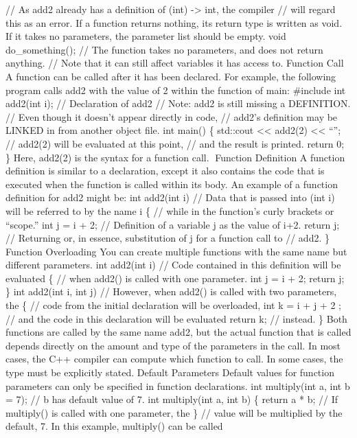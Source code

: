 {// As add2 already has a definition of (int) -\textgreater{} int, the
compiler // will regard this as an error. If a function returns nothing,
its return type is written as void. If it takes no parameters, the
parameter list should be empty. void do\_something(); // The function
takes no parameters, and does not return anything. // Note that it can
still affect variables it has access to. Function Call A function can be
called after it has been declared. For example, the following program
calls add2 with the value of 2 within the function of main: \#include
int add2(int i); // Declaration of add2 // Note: add2 is still missing a
DEFINITION. // Even though it doesn't appear directly in code, // add2's
definition may be LINKED in from another object file. int main() \{
std::cout \textless\textless{} add2(2) \textless\textless{} ``\n''; //
add2(2) will be evaluated at this point, // and the result is printed.
return 0;\\
\} Here, add2(2) is the syntax for a function call. Function Deﬁnition
A function deﬁnition} is similar to a declaration, except it also
contains the code that is executed when the function is called within
its body. An example of a function deﬁnition for add2 might be: int
add2(int i) // Data that is passed into (int i) will be referred to by
the name i \{ // while in the function's curly brackets or ``scope.''
int j = i + 2; // Definition of a variable j as the value of i+2. return
j; // Returning or, in essence, substitution of j for a function call to
// add2. \} Function Overloading You can create multiple functions with
the same name but diﬀerent parameters. int add2(int i) // Code contained
in this definition will be evaluated \{ // when add2() is called with
one parameter. int j = i + 2; return j; \} int add2(int i, int j) //
However, when add2() is called with two parameters, the \{ // code from
the initial declaration will be overloaded, int k = i + j + 2 ; // and
the code in this declaration will be evaluated return k; // instead. \}
Both functions are called by the same name add2, but the actual function
that is called depends directly on the amount and type of the parameters
in the call. In most cases, the C++ compiler can compute which function
to call. In some cases, the type must be explicitly stated. Default
Parameters Default values for function parameters can only be speciﬁed
in function declarations. int multiply(int a, int b = 7); // b has
default value of 7. int multiply(int a, int b) \{ return a * b; // If
multiply() is called with one parameter, the \} // value will be
multiplied by the default, 7. In this example, multiply() can be called
